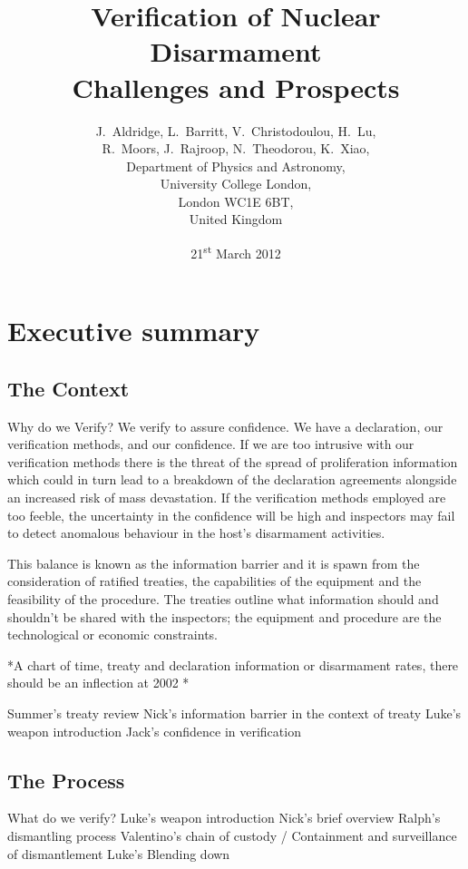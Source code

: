 \documentclass[twoside,titlepage,11pt,twocolumn,a4paper]{article}
\begin{document}
\title{Verification of Nuclear Disarmament \\
Challenges and Prospects}
\author{J.~Aldridge, L.~Barritt, V.~Christodoulou, H.~Lu, \\
	R.~Moors, J.~Rajroop, N.~Theodorou, K.~Xiao, \\
\small	Department of Physics and Astronomy, \\
\small	University College London, \\
\small	London WC1E 6BT, \\
\small	United Kingdom}
\date{21\textsuperscript{st} March 2012}
\maketitle

\onecolumn
\cleardoublepage

\section*{Executive summary}
\subsection*{The Context}
Why do we Verify?  We verify to assure confidence. We have a
declaration, our verification methods, and our confidence. If we are
too intrusive with our verification methods there is the threat of the
spread of proliferation information which could in turn lead to a
breakdown of the declaration agreements alongside an increased risk of
mass devastation. If the verification methods employed are too feeble,
the uncertainty in the confidence will be high and inspectors may fail
to detect anomalous behaviour in the host's disarmament activities.

This balance is known as the information barrier and it is spawn from
the consideration of ratified treaties, the capabilities of the
equipment and the feasibility of the procedure. The treaties outline
what information should and shouldn't be shared with the inspectors;
the equipment and procedure are the technological or economic
constraints.

*A chart of time, treaty and declaration information or disarmament
rates, there should be an inflection at 2002 *

Summer's treaty review
Nick's information barrier in the context of treaty
Luke's weapon introduction
Jack's confidence in verification

\subsection*{The Process}
What do we verify?
Luke's weapon introduction
Nick's brief overview 
Ralph's dismantling process
Valentino's chain of custody / Containment and surveillance of dismantlement 
Luke's Blending down
\end{document}
